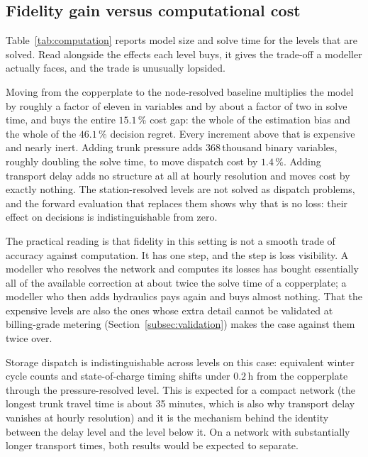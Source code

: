 \documentclass[a4paper,fleqn]{cas-sc}
\begin{document}
\subsection{Fidelity gain versus computational cost}
\label{subsec:computation}

Table~\ref{tab:computation} reports model size and solve time for the levels that are
solved. Read alongside the effects each level buys, it gives the trade-off a modeller
actually faces, and the trade is unusually lopsided.

Moving from the copperplate to the node-resolved baseline multiplies the model by roughly
a factor of eleven in variables and by about a factor of two in solve time, and buys the
entire $15.1$\,\% cost gap: the whole of the estimation bias and the whole of the
$46.1$\,\% decision regret. Every increment above that is expensive and nearly inert.
Adding trunk pressure adds $368$\,thousand binary variables, roughly doubling the solve
time, to move dispatch cost by $1.4$\,\%. Adding transport delay adds no structure at all
at hourly resolution and moves cost by exactly nothing. The station-resolved levels are
not solved as dispatch problems, and the forward evaluation that replaces them shows why
that is no loss: their effect on decisions is indistinguishable from zero.

The practical reading is that fidelity in this setting is not a smooth trade of accuracy
against computation. It has one step, and the step is loss visibility. A modeller who
resolves the network and computes its losses has bought essentially all of the available
correction at about twice the solve time of a copperplate; a modeller who then adds
hydraulics pays again and buys almost nothing. That the expensive levels are also the ones
whose extra detail cannot be validated at billing-grade metering
(Section~\ref{subsec:validation}) makes the case against them twice over.

Storage dispatch is indistinguishable across levels on this case: equivalent winter cycle
counts and state-of-charge timing shifts under $0.2$\,h from the copperplate through the
pressure-resolved level. This is expected for a compact network (the longest trunk travel
time is about 35 minutes, which is also why transport delay vanishes at hourly resolution)
and it is the mechanism behind the identity between the delay level and the level below
it. On a network with substantially longer transport times, both results would be expected
to separate.
\end{document}
